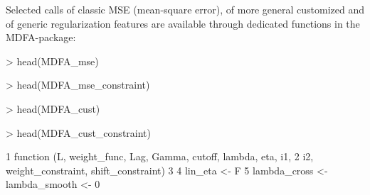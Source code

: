 \documentclass[a4paper]{book}
\begin{document}
Selected calls of classic MSE (mean-square error), of more general customized and of generic regularization features are available through dedicated functions in the MDFA-package: 
\begin{Schunk}
\begin{Sinput}
> head(MDFA_mse)
\end{Sinput}
\begin{Soutput}
1 function (L, weight_func, Lag, Gamma) 
2 {                                     
3     cutoff <- pi                      
4     lin_eta <- F                      
5     lambda <- 0                       
6     eta <- 0                          
\end{Soutput}
\begin{Sinput}
> head(MDFA_mse_constraint)
\end{Sinput}
\begin{Soutput}
1 function (L, weight_func, Lag, Gamma, i1, i2, weight_constraint, 
2     shift_constraint)                                            
3 {                                                                
4     cutoff <- pi                                                 
5     lin_eta <- F                                                 
6     lambda <- 0                                                  
\end{Soutput}
\begin{Sinput}
> head(MDFA_cust)
\end{Sinput}
\begin{Soutput}
1 function (L, weight_func, Lag, Gamma, cutoff, lambda, eta)                  
2 {                                                                           
3     lin_eta <- F                                                            
4     weight_constraint <- rep(1/(ncol(weight_func) - 1), ncol(weight_func) - 
5         1)                                                                  
6     lambda_cross <- lambda_smooth <- 0                                      
\end{Soutput}
\begin{Sinput}
> head(MDFA_cust_constraint)
\end{Sinput}
\begin{Soutput}
1 function (L, weight_func, Lag, Gamma, cutoff, lambda, eta, i1, 
2     i2, weight_constraint, shift_constraint)                   
3 {                                                              
4     lin_eta <- F                                               
5     lambda_cross <- lambda_smooth <- 0                         
}
\end{Soutput}
\end{Schunk}
\end{document}
